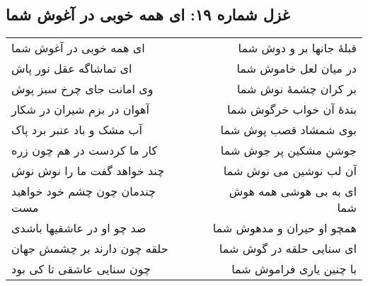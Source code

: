 \begin{center}
\section*{غزل شماره ۱۹: ای همه خوبی در آغوش شما}
\label{sec:019}
\begin{longtable}{l p{0.5cm} r}
ای همه خوبی در آغوش شما
&&
قبلهٔ جانها بر و دوش شما
\\
ای تماشاگه عقل نور پاش
&&
در میان لعل خاموش شما
\\
وی امانت جای چرخ سبز پوش
&&
بر کران چشمهٔ نوش شما
\\
آهوان در بزم شیران در شکار
&&
بندهٔ آن خواب خرگوش شما
\\
آب مشک و باد عنبر برد پاک
&&
بوی شمشاد قصب پوش شما
\\
کار ما کردست در هم چون زره
&&
جوشن مشکین پر جوش شما
\\
چند خواهد گفت ما را نوش نوش
&&
آن لب نوشین می نوش شما
\\
چندمان چون چشم خود خواهید مست
&&
ای به بی هوشی همه هوش شما
\\
صد چو او در عاشقیها باشدی
&&
همچو او حیران و مدهوش شما
\\
حلقه چون دارند بر چشمش جهان
&&
ای سنایی حلقه در گوش شما
\\
چون سنایی عاشقی تا کی بود
&&
با چنین یاری فراموش شما
\\
\end{longtable}
\end{center}
